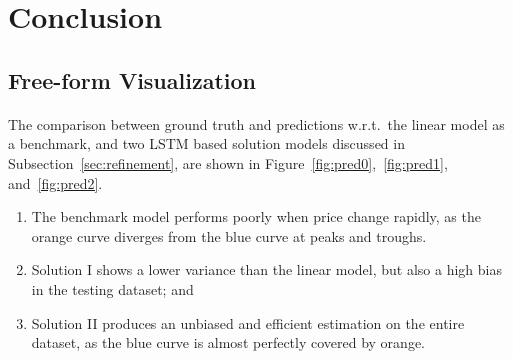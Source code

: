 \documentclass[12pt, letterpaper]{article}
\begin{document}
\section{Conclusion} %

\subsection{Free-form Visualization}



\paragraph{}
The comparison between ground truth and predictions w.r.t.\ the linear model as a benchmark, and two LSTM based solution models discussed in Subsection~\ref{sec:refinement}, are shown in Figure~\ref{fig:pred0},\ \ref{fig:pred1}, and\ \ref{fig:pred2}.

\begin{enumerate}
    \item The benchmark model performs poorly when price change rapidly, as the orange curve diverges from the blue curve at peaks and troughs.
    \item Solution I shows a lower variance than the linear model, but also a high bias in the testing dataset; and
    \item Solution II produces an unbiased and efficient estimation on the entire dataset, as the blue curve is almost perfectly covered by orange.
\end{enumerate}
\end{document}

